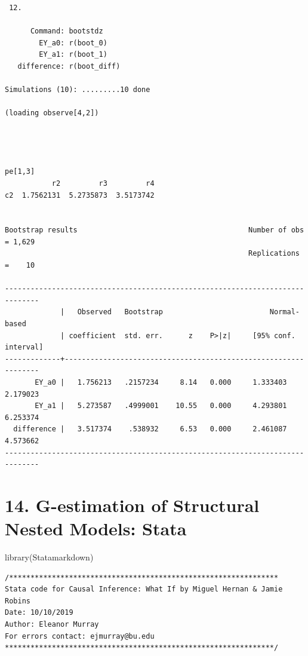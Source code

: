 \documentclass[
  10pt,
  a4paper,
]{book}
\newenvironment{Shaded}{\begin{snugshade}}{\end{snugshade}}
\newcommand{\FunctionTok}[1]{\textcolor[rgb]{0.28,0.35,0.67}{#1}}
\newcommand{\NormalTok}[1]{\textcolor[rgb]{0.00,0.46,0.62}{#1}}
\begin{document}
\begin{verbatim}
 12. 

      Command: bootstdz
        EY_a0: r(boot_0)
        EY_a1: r(boot_1)
   difference: r(boot_diff)

Simulations (10): .........10 done

(loading observe[4,2])




pe[1,3]
           r2         r3         r4
c2  1.7562131  5.2735873  3.5173742


Bootstrap results                                        Number of obs = 1,629
                                                         Replications  =    10

------------------------------------------------------------------------------
             |   Observed   Bootstrap                         Normal-based
             | coefficient  std. err.      z    P>|z|     [95% conf. interval]
-------------+----------------------------------------------------------------
       EY_a0 |   1.756213   .2157234     8.14   0.000     1.333403    2.179023
       EY_a1 |   5.273587   .4999001    10.55   0.000     4.293801    6.253374
  difference |   3.517374    .538932     6.53   0.000     2.461087    4.573662
------------------------------------------------------------------------------
\end{verbatim}

\chapter*{14. G-estimation of Structural Nested Models: Stata}\label{g-estimation-of-structural-nested-models-stata}

\begin{Shaded}
\begin{Highlighting}[]
\FunctionTok{library}\NormalTok{(Statamarkdown)}
\end{Highlighting}
\end{Shaded}

\begin{verbatim}
/***************************************************************
Stata code for Causal Inference: What If by Miguel Hernan & Jamie Robins
Date: 10/10/2019
Author: Eleanor Murray 
For errors contact: ejmurray@bu.edu
***************************************************************/
\end{verbatim}
\end{document}
